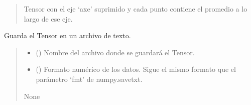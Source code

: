 \documentclass[letterpaper,10pt,english]{sphinxmanual}
\begin{document}
\begin{fulllineitems}
\begin{fulllineitems}
\begin{quote}
\begin{description}
\sphinxAtStartPar
Tensor con el eje ‘axe’ suprimido y cada punto contiene el promedio a lo largo de ese eje.

\sphinxAtStartPar
{\hyperref[\detokenize{utils.tensor:utils.tensor.Tensor}]{}}

\end{description}\end{quote}

\end{fulllineitems}


\begin{fulllineitems}
\label{\detokenize{utils.tensor:utils.tensor.Tensor.save}}
\pysigstartsignatures
{}
\pysigstopsignatures
\sphinxAtStartPar
Guarda el Tensor en un archivo de texto.
\begin{quote}\begin{description}
\begin{itemize}
\item {} 
\sphinxAtStartPar
{} () \textendash{} Nombre del archivo donde se guardará el Tensor.

\item {} 
\sphinxAtStartPar
{} (\sphinxstyleliteralemphasis{\sphinxupquote{, }}) \textendash{} Formato numérico de los datos. Sigue el mismo formato que el parámetro ‘fmt’
de numpy.savetxt.

\end{itemize}

\sphinxAtStartPar
None

\end{description}\end{quote}

\end{fulllineitems}



\end{fulllineitems}
\end{document}
